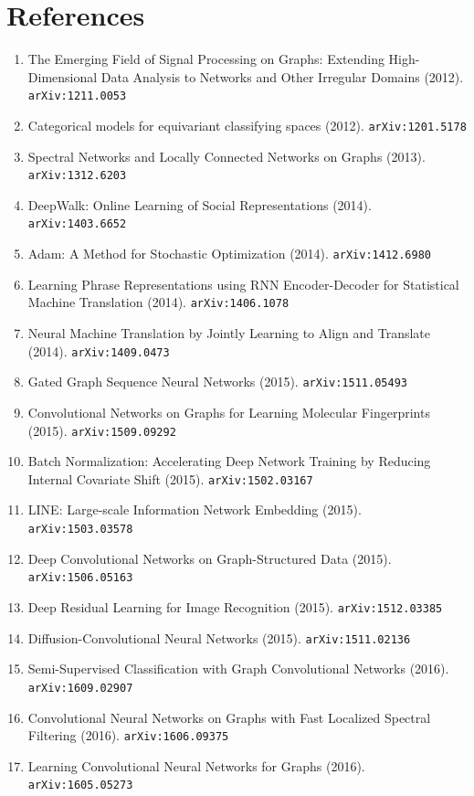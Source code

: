 \documentclass[11pt]{article}
\begin{document}
\section*{References}
\begin{enumerate}\small
  \item The Emerging Field of Signal Processing on Graphs: Extending
  High-Dimensional Data Analysis to Networks and Other Irregular Domains (2012). \texttt{arXiv:1211.0053}
  \item Categorical models for equivariant classifying spaces (2012). \texttt{arXiv:1201.5178}
  \item Spectral Networks and Locally Connected Networks on Graphs (2013). \texttt{arXiv:1312.6203}
  \item DeepWalk: Online Learning of Social Representations (2014). \texttt{arXiv:1403.6652}
  \item Adam: A Method for Stochastic Optimization (2014). \texttt{arXiv:1412.6980}
  \item Learning Phrase Representations using RNN Encoder-Decoder for
  Statistical Machine Translation (2014). \texttt{arXiv:1406.1078}
  \item Neural Machine Translation by Jointly Learning to Align and Translate (2014). \texttt{arXiv:1409.0473}
  \item Gated Graph Sequence Neural Networks (2015). \texttt{arXiv:1511.05493}
  \item Convolutional Networks on Graphs for Learning Molecular Fingerprints (2015). \texttt{arXiv:1509.09292}
  \item Batch Normalization: Accelerating Deep Network Training by Reducing
  Internal Covariate Shift (2015). \texttt{arXiv:1502.03167}
  \item LINE: Large-scale Information Network Embedding (2015). \texttt{arXiv:1503.03578}
  \item Deep Convolutional Networks on Graph-Structured Data (2015). \texttt{arXiv:1506.05163}
  \item Deep Residual Learning for Image Recognition (2015). \texttt{arXiv:1512.03385}
  \item Diffusion-Convolutional Neural Networks (2015). \texttt{arXiv:1511.02136}
  \item Semi-Supervised Classification with Graph Convolutional Networks (2016). \texttt{arXiv:1609.02907}
  \item Convolutional Neural Networks on Graphs with Fast Localized Spectral
  Filtering (2016). \texttt{arXiv:1606.09375}
  \item Learning Convolutional Neural Networks for Graphs (2016). \texttt{arXiv:1605.05273}

\end{enumerate}
\end{document}
